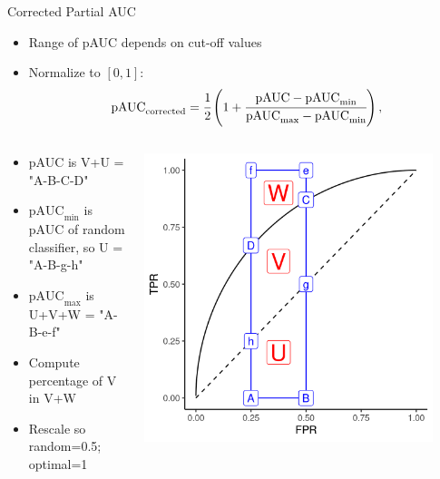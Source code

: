\begin{vbframe}{Corrected Partial AUC}

\begin{itemize}
\item Range of pAUC depends on cut-off values
\item Normalize to $[0, 1]$:
  $$\text{pAUC}_\text{corrected} = \cfrac{1}{2} \left( 1 + \cfrac{\text{pAUC} - 
  \text{pAUC}_{\text{min}}}{\text{pAUC}_{\text{max}} - \text{pAUC}_{\text{min}}} 
  \right),$$
\end{itemize}

\begin{columns} 
\begin{column}{0.6\textwidth} 
\begin{itemize}
  \item pAUC is V+U = "A-B-C-D"
  \item $\text{pAUC}_{\text{min}}$ is pAUC of random classifier, 
      so U = "A-B-g-h"
  \item $\text{pAUC}_{\text{max}}$ is U+V+W = "A-B-e-f"
  \item Compute percentage of V in V+W
\item Rescale so random=0.5; optimal=1
\end{itemize}
\end{column} 
\begin{column}{0.4\textwidth} 
\begin{center}
\includegraphics[width=0.9\textwidth]{figure/fig_pauc}
\end{center}
\end{column} 
\end{columns} 
\end{vbframe}

